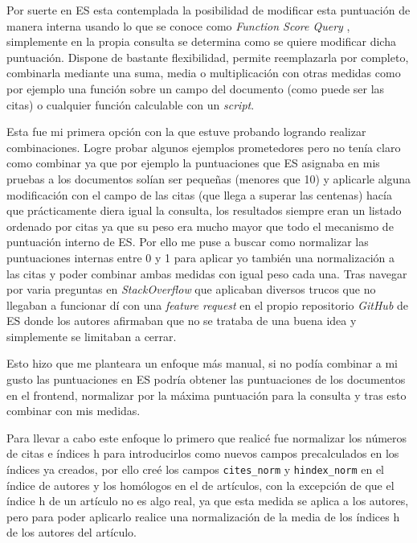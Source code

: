 Por suerte en \acrshort{ES} esta contemplada la posibilidad de modificar esta puntuación de manera interna usando lo que se conoce como \textit{Function Score Query} \cite{ES_func_score}, simplemente en la propia consulta se determina como se quiere modificar dicha puntuación. Dispone de bastante flexibilidad, permite reemplazarla por completo, combinarla mediante una suma, media o multiplicación con otras medidas como por ejemplo una función sobre un campo del documento (como puede ser las citas) o cualquier función calculable con un \textit{script}. 

Esta fue mi primera opción con la que estuve probando logrando realizar combinaciones. Logre probar algunos ejemplos prometedores pero no tenía claro como combinar ya que por ejemplo la puntuaciones que \acrshort{ES} asignaba en mis pruebas a los documentos solían ser pequeñas (menores que 10) y aplicarle alguna modificación con el campo de las citas (que llega a superar las centenas) hacía que prácticamente diera igual la consulta, los resultados siempre eran un listado ordenado por citas ya que su peso era mucho mayor que todo el mecanismo de puntuación interno de \acrshort{ES}. Por ello me puse a buscar como normalizar las puntuaciones internas entre 0 y 1 para aplicar yo también una normalización a las citas y poder combinar ambas medidas con igual peso cada una. Tras navegar por varia preguntas en \textit{StackOverflow} que aplicaban diversos trucos que no llegaban a funcionar dí con una \textit{feature request} en el propio repositorio \textit{GitHub} de \acrshort{ES} \cite{ES_normalize_score} donde los autores afirmaban que no se trataba de una buena idea y simplemente se limitaban a cerrar.

Esto hizo que me planteara un enfoque más manual, si no podía combinar a mi gusto las puntuaciones en \acrshort{ES} podría obtener las puntuaciones de los documentos en el \gls{frontend}, normalizar por la máxima puntuación para la consulta y tras esto combinar con mis medidas. 

Para llevar a cabo este enfoque lo primero que realicé fue normalizar los números de citas e índices h para introducirlos como nuevos campos precalculados en los índices ya creados, por ello creé los campos \texttt{cites\_norm} y \texttt{hindex\_norm} en el índice de autores y los homólogos en el de artículos, con la excepción de que el índice h de un artículo no es algo real, ya que esta medida se aplica a los autores, pero para poder aplicarlo realice una normalización de la media de los índices h de los autores del artículo.

